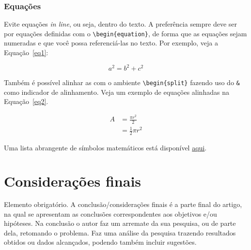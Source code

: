 \documentclass[
	article,			%
	12pt,				%
	oneside,			%
	a4paper,			%
	english,			%
	brazil,				%
	sumario=tradicional
]{abntex2}
\begin{document}
\subsubsection{Equações}

Evite equações \textit{in line}, ou seja, dentro do texto. A preferência sempre deve ser por equações definidas com o \verb|\begin{equation}|, de forma que as equações sejam numeradas e que você possa referenciá-las no texto. Por exemplo, veja a Equação~\ref{eq1}:

\begin{equation} \label{eq1}
	a^2 = b^2 + c^2
\end{equation}

Também é possível alinhar as com o ambiente \verb|\begin{split}| fazendo uso do \verb|&| como indicador de alinhamento. Veja um exemplo de equações alinhadas na Equação~\ref{eq2}.

\begin{equation} \label{eq2}
	\begin{split}
	A & = \frac{\pi r^2}{2} \\
	 & = \frac{1}{2} \pi r^2
	\end{split}
\end{equation}

Uma lista abrangente de símbolos matemáticos está disponível \href{https://oeis.org/wiki/List_of_LaTeX_mathematical_symbols}{aqui}.

\section{Considerações finais}

Elemento obrigatório. A conclusão/considerações finais é a parte final do artigo, na qual se apresentam as conclusões correspondentes aos objetivos e/ou hipóteses. Na conclusão o autor faz um arremate da sua pesquisa, ou de parte dela, retomando o problema. Faz uma análise da pesquisa trazendo resultados obtidos ou dados alcançados, podendo também incluir sugestões.


\postextual


\end{document}
